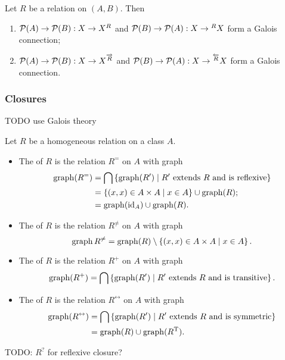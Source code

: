 \begin{proposition}
Let $R$ be a relation on $(A,B)$. Then
\begin{enumerate}
\item $\operatorname{\mathcal{P}}(A)\to \operatorname{\mathcal{P}}(B): X\to X^R$ and $\operatorname{\mathcal{P}}(B)\to \operatorname{\mathcal{P}}(A): X\to {^RX}$ form a Galois connection;
\item $\operatorname{\mathcal{P}}(A)\to \operatorname{\mathcal{P}}(B): X\to X^{\overrightarrow{R}}$ and $\operatorname{\mathcal{P}}(B)\to \operatorname{\mathcal{P}}(A): X\to {^{\overleftarrow{R}}X}$ form a Galois connection.
\end{enumerate}
\end{proposition}

\subsubsection{Closures}
TODO use Galois theory
\begin{definition}
Let $R$ be a homogeneous relation on a class $A$.
\begin{itemize}
\item The  of $R$ is the relation $R^=$ on $A$ with graph
\begin{align*}
\operatorname{graph}(R^=) &= \bigcap\left\{ \operatorname{graph}(R') \;\middle|\; \text{$R'$ extends $R$ and is reflexive} \right\} \\
&= \left\{ (x,x)\in A\times A \;\middle|\; x\in A \right\}\cup \operatorname{graph}(R); \\
&= \operatorname{graph}(\operatorname{id}_A)\cup \operatorname{graph}(R).
\end{align*}
\item The  of $R$ is the relation $R^{\neq}$ on $A$ with graph
\[ \operatorname{graph}{R^{\neq}} = \operatorname{graph}(R)\setminus \left\{ (x,x)\in A\times A \;\middle|\; x \in A \right\}. \]
\item The  of $R$ is the relation $R^{+}$ on $A$ with graph
\[ \operatorname{graph}(R^+) = \bigcap\left\{ \operatorname{graph}(R') \;\middle|\; \text{$R'$ extends $R$ and is transitive} \right\}. \]
\item The  of $R$ is the relation $R^{\leftrightarrow}$ on $A$ with graph
\begin{align*}
\operatorname{graph}(R^\leftrightarrow) &= \bigcap\left\{ \operatorname{graph}(R') \;\middle|\; \text{$R'$ extends $R$ and is symmetric} \right\} \\
&=  \operatorname{graph}(R)\cup \operatorname{graph}(R^{\mathrm{T}}).
\end{align*}
\end{itemize}
\end{definition}

TODO: $R^?$ for reflexive closure?

